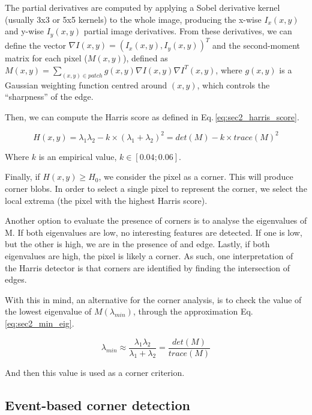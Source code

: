 The partial derivatives are computed by applying a Sobel derivative kernel (usually 3x3 or 5x5 kernels) to the whole image, producing the x-wise $I_x (x,y)$ and y-wise $I_y (x,y)$ partial image derivatives. From these derivatives, we can define the vector $\nabla I(x,y) = (I_x (x,y),I_y (x,y))^T$ and the second-moment matrix for each pixel ($M(x,y)$), defined as $M(x,y)= \sum_{(x,y)\in patch}^{}g(x,y)\nabla I(x,y)\nabla I^T(x,y)$, where $g(x,y)$ is a Gaussian weighting function centred around $(x,y)$, which controls the “sharpness” of the edge.

Then, we can compute the Harris score as defined in Eq.\,\eqref{eq:sec2_harris_score}.

\begin{equation}
    \label{eq:sec2_harris_score}
    H(x,y)=\lambda_1\lambda_2-k\times \left( \lambda_1 + \lambda_2 \right)^2 = det(M) - k\times trace (M)^2
\end{equation}

Where $k$ is an empirical value, $k \in \left[ 0.04; 0.06 \right ]$.

Finally, if $H(x,y)\geq H_0$, we consider the pixel as a corner. This will produce corner blobs. In order to select a single pixel to represent the corner, we select the local extrema (the pixel with the highest Harris score).

Another option to evaluate the presence of corners is to analyse the eigenvalues of M. If both eigenvalues are low, no interesting features are detected. If one is low, but the other is high, we are in the presence of and edge. Lastly, if both eigenvalues are high, the pixel is likely a corner. As such, one interpretation of the Harris detector is that corners are identified by finding the intersection of edges.

With this in mind, an alternative for the corner analysis, is to check the value of the lowest eigenvalue of $M (\lambda_{min})$, through the approximation Eq.\,\eqref{eq:sec2_min_eig}.

\begin{equation}
    \label{eq:sec2_min_eig}
    \lambda_{min} \approx \frac{\lambda_1\lambda_2}{\lambda_1+\lambda_2}=\frac{det(M)}{trace(M)}
\end{equation}

And then this value is used as a corner criterion.

\subsection{Event-based corner detection}
\label{sec:sec2_event_corner}

